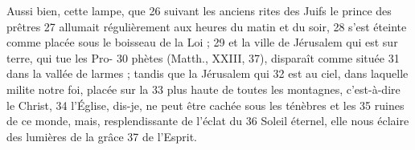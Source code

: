 Aussi bien, cette lampe, que	 
26	 	suivant les anciens rites des Juifs le prince des prêtres	 
27	 	allumait régulièrement aux heures du matin et du soir,	 
28	 	s'est éteinte comme placée sous le boisseau de la Loi ;	 
29	 	et la ville de Jérusalem qui est sur terre, qui tue les Pro-	 
30	 	phètes (Matth., XXIII, 37), disparaît comme située	 
31	 	dans la vallée de larmes ; tandis que la Jérusalem qui	 
32	 	est au ciel, dans laquelle milite notre foi, placée sur la	 
33	 	plus haute de toutes les montagnes, c'est-à-dire le Christ,	 
34	 	l'Église, dis-je, ne peut être cachée sous les ténèbres et les	 
35	 	ruines de ce monde, mais, resplendissante de l'éclat du	 
36	 	Soleil éternel, elle nous éclaire des lumières de la grâce	 
37	 	de l'Esprit.